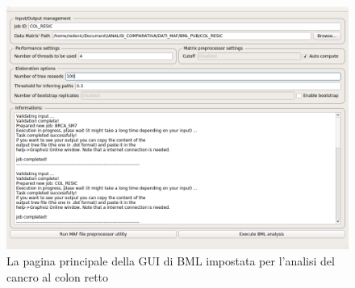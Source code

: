 \documentclass[a4paper]{article}
\begin{document}
	\begin{figure}[H]
	  \centering
	  \includegraphics[scale=0.36, keepaspectratio]{BMLMainMenu.png}%
	  \captionsetup{justification=centering,margin=0.5cm}
	  \caption{La pagina principale della GUI di BML impostata per l'analisi del cancro al colon retto} \label{fig:BMLMainMenu}
	\end{figure}
\end{document}
